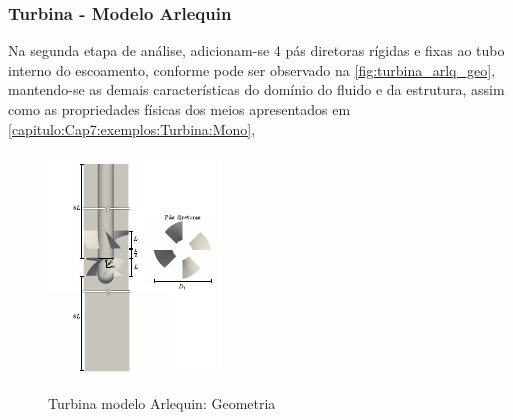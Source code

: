 \begin{figure}[!htbp]
	\label{fig:turbina_mono_press}
\end{figure}


\subsubsection{Turbina - Modelo Arlequin}

Na segunda etapa de análise, adicionam-se 4 pás diretoras rígidas e fixas ao tubo interno do escoamento, conforme pode ser observado na \autoref{fig:turbina_arlq_geo}, mantendo-se as demais características do domínio do fluido e da estrutura, assim como as propriedades físicas dos meios apresentados em \autoref{capitulo:Cap7:exemplos:Turbina:Mono}, 

\begin{figure}[!htbp]
	\caption{Turbina modelo Arlequin: Geometria}
	\centering 
	\includegraphics[scale=3.0,trim=0cm 0cm 0cm 0cm, clip=true]{Imagens/Cap7/turbina_arlq_geo.pdf}	
	\label{fig:turbina_arlq_geo}
\end{figure}

